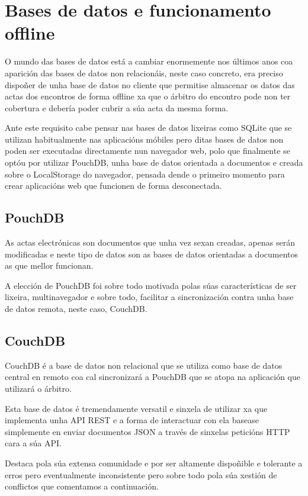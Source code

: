   \section{Bases de datos e funcionamento offline}
  O mundo das bases de datos está a cambiar enormemente nos últimos anos coa 
aparición das bases de datos non relacionáis, neste caso concreto, era preciso 
dispoñer de unha base de datos no cliente que permitise almacenar os 
datos das actas dos encontros de forma offline xa que o árbitro do encontro 
pode non ter cobertura e debería poder cubrir a súa acta da mesma forma.

  Ante este requisito cabe pensar nas bases de datos lixeiras como SQLite que 
se utilizan habitualmente nas aplicacións móbiles pero ditas bases de datos non 
poden ser executadas directamente nun navegador web, polo que finalmente se 
optóu por utilizar PouchDB, unha base de datos orientada a documentos e creada 
sobre o LocalStorage do navegador, pensada dende o primeiro momento para 
crear aplicacións web que funcionen de forma desconectada.

    \subsection{PouchDB}
    As actas electrónicas son documentos que unha vez sexan creadas, apenas 
serán modificadas e neste tipo de datos son as bases de datos orientadas a 
documentos as que mellor funcionan.

    A elección de PouchDB foi sobre todo motivada polas súas características de 
ser lixeira, multinavegador e sobre todo, facilitar a sincronización contra 
unha base de datos remota, neste caso, CouchDB.

    \subsection{CouchDB}
    CouchDB é a base de datos non relacional que se utiliza como base de datos 
central en remoto coa cal sincronizará a PouchDB que se atopa na aplicación que 
utilizará o árbitro.

    Esta base de datos é tremendamente versatil e sinxela de utilizar xa que 
implementa unha API REST e a forma de interactuar con ela basease simplemente 
en enviar documentos JSON a través de sinxelas peticións HTTP cara a súa API.

    Destaca pola súa extensa comunidade e por ser altamente dispoñible e 
tolerante a erros pero eventualmente inconsistente pero sobre todo pola súa 
xestión de conflictos que comentamos a continuación.

